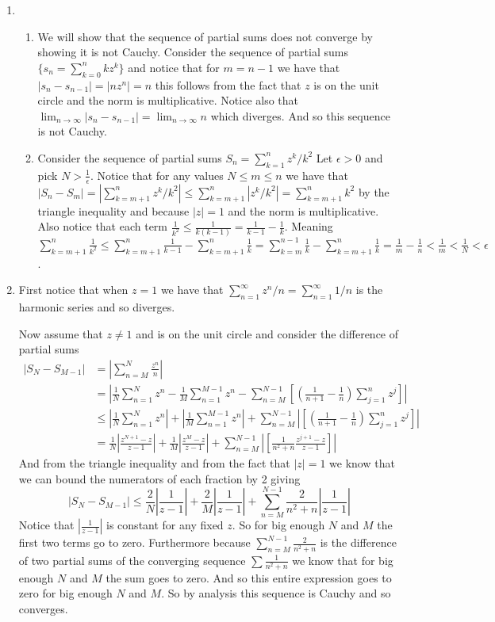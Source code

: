 \documentclass[12pt]{amsart}
\theoremstyle{definition}
\newcommand{\ra}{\rightarrow}
\begin{document}
\begin{enumerate}
\item
\begin{enumerate}
    \item We will show that the sequence of partial sums does not converge by showing it is not Cauchy. Consider the sequence of partial sums $\{s_n=\sum_{k=0}^{n}kz^k\}$ and notice that for $m=n-1$ we have that $|s_n-s_{n-1}|=|nz^n| = n$ this follows from the fact that $z$ is on the unit circle and the norm is multiplicative. Notice also that $\lim_{n\ra \infty} |s_n-s_{n-1}|=\lim_{n\ra\infty} n$ which diverges. And so this sequence is not Cauchy.\\

    \item Consider the sequence of partial sums $S_n=\sum_{k=1}^{n}z^k/k^2$ Let $\epsilon>0$ and pick $N>\frac{1}{\epsilon}$. Notice that for any values $N\leq m\leq n$ we have that $|S_n-S_m|=|\sum_{k=m+1}^{n}z^k/k^2|\leq \sum_{k=m+1}^{n}|z^k/k^2|=\sum_{k=m+1}^{n}k^2$ by the triangle inequality and because $|z|=1$ and the norm is multiplicative. Also notice that each term $\frac{1}{k^2}\leq \frac{1}{k(k-1)}=\frac{1}{k-1}-\frac{1}{k}$. Meaning $\sum_{k=m+1}^{n}\frac{1}{k^2}\leq\sum_{k=m+1}^{n}\frac{1}{k-1}-\sum_{k=m+1}^{n}\frac{1}{k}=\sum_{k=m}^{n-1}\frac{1}{k}-\sum_{k=m+1}^{n}\frac{1}{k}=\frac{1}{m}-\frac{1}{n}< \frac{1}{m}< \frac{1}{N}<\epsilon$.\\
\end{enumerate}

\item First notice that when $z=1$ we have that $\sum_{n=1}^\infty z^n/n=\sum_{n=1}^\infty 1/n$ is the harmonic series and so diverges.

Now assume that $z\neq 1$ and is on the unit circle and consider the difference of partial sums 
\begin{align*}
|S_N-S_{M-1}|&=|\sum_{n=M}^N\frac{z^n}{n}|\\
&=|\frac{1}{N}\sum_{n=1}^Nz^n-\frac{1}{M}\sum_{n=1}^{M-1}z^n-\sum_{n=M}^{N-1}\left[(\frac{1}{n+1}-\frac{1}{n})\sum_{j=1}^nz^j\right]|\\
&\leq |\frac{1}{N}\sum_{n=1}^Nz^n|+|\frac{1}{M}\sum_{n=1}^{M-1}z^n|+\sum_{n=M}^{N-1}|\left[(\frac{1}{n+1}-\frac{1}{n})\sum_{j=1}^nz^j\right]|\\
&=\frac{1}{N}|\frac{z^{N+1}-z}{z-1}|+\frac{1}{M}|\frac{z^{M}-z}{z-1}|+\sum_{n=M}^{N-1}|\left[\frac{1}{n^2+n}\frac{z^{j+1}-z}{z-1}\right]|
\end{align*}
And from the triangle inequality and from the fact that $|z|=1$ we know that we can bound the numerators of each fraction by 2 giving 
$$|S_N-S_{M-1}|\leq \frac{2}{N}|\frac{1}{z-1}|+\frac{2}{M}|\frac{1}{z-1}|+\sum_{n=M}^{N-1}\frac{2}{n^2+n}|\frac{1}{z-1}|$$
Notice that $|\frac{1}{z-1}|$ is constant for any fixed $z$. So for big enough $N$ and $M$ the first two terms go to zero. Furthermore because $\sum_{n=M}^{N-1}\frac{2}{n^2+n}$ is the difference of two partial sums of the converging sequence $\sum \frac{1}{n^2+n}$ we know that for big enough $N$ and $M$ the sum goes to zero. And so this entire expression goes to zero for big enough $N$ and $M$. So by analysis this sequence is Cauchy and so converges.\\  


\end{enumerate}
\end{document}
